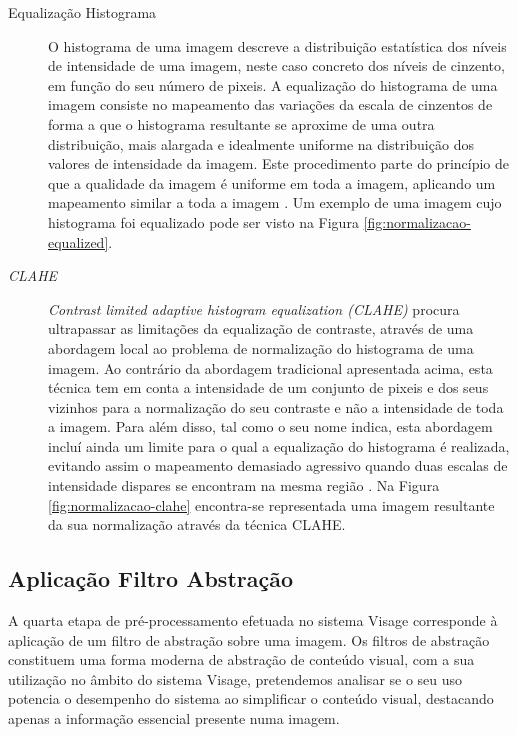 \begin{description}
\item[Equalização Histograma]
O histograma de uma imagem descreve a distribuição estatística dos níveis de intensidade de uma imagem, neste caso concreto dos níveis de cinzento, em função do seu número de pixeis. A equalização do histograma de uma imagem consiste no mapeamento das variações da escala de cinzentos de forma a que o histograma resultante se aproxime de uma outra distribuição, mais alargada e idealmente uniforme na distribuição dos valores de intensidade da imagem. Este procedimento parte do princípio de que a qualidade da imagem é uniforme em toda a imagem, aplicando um mapeamento similar a toda a imagem \cite{Bradski2008}. Um exemplo de uma imagem cujo histograma foi equalizado pode ser visto na Figura \ref{fig:normalizacao-equalized}.
\end{description}

\begin{description}
\item[\textit{CLAHE}]
\textit{Contrast limited adaptive histogram equalization (CLAHE)} procura ultrapassar as limitações da equalização de contraste, através de uma abordagem local ao problema de normalização do histograma de uma imagem. Ao contrário da abordagem tradicional apresentada acima, esta técnica tem em conta a intensidade de um conjunto de pixeis e dos seus vizinhos para a normalização do seu contraste e não a intensidade de toda a imagem. Para além disso, tal como o seu nome indica, esta abordagem incluí ainda um limite para o qual a equalização do histograma é realizada, evitando assim o mapeamento demasiado agressivo quando duas escalas de intensidade dispares se encontram na mesma região \cite{Reza2004}. Na Figura \ref{fig:normalizacao-clahe} encontra-se representada uma imagem resultante da sua normalização através da técnica CLAHE.
\end{description}

\subsection{Aplicação Filtro Abstração} \label{sec:filtros}
A quarta etapa de pré-processamento efetuada no sistema Visage corresponde à aplicação de um filtro de abstração sobre uma imagem. Os filtros de abstração constituem uma forma moderna de abstração de conteúdo visual, com a sua utilização no âmbito do sistema Visage, pretendemos analisar se o seu uso potencia o desempenho do sistema ao simplificar o conteúdo visual, destacando apenas a informação essencial presente numa imagem.


